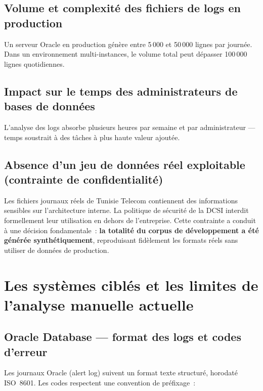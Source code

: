 \documentclass[12pt,a4paper]{report}
\begin{document}
\subsection{Volume et complexit\'e des fichiers de logs en production}

Un serveur Oracle en production g\'en\`ere entre 5\,000 et 50\,000 lignes par
journ\'ee. Dans un environnement multi-instances, le volume total peut d\'epasser
100\,000 lignes quotidiennes.

\subsection{Impact sur le temps des administrateurs de bases de donn\'ees}

L'analyse des logs absorbe plusieurs heures par semaine et par administrateur ---
temps soustrait \`a des t\^aches \`a plus haute valeur ajout\'ee.

\subsection{Absence d'un jeu de donn\'ees r\'eel exploitable (contrainte de confidentialit\'e)}

Les fichiers journaux r\'eels de Tunisie Telecom contiennent des informations
sensibles sur l'architecture interne. La politique de s\'ecurit\'e de la DCSI
interdit formellement leur utilisation en dehors de l'entreprise. Cette contrainte
a conduit \`a une d\'ecision fondamentale~: \textbf{la totalit\'e du corpus de
d\'eveloppement a \'et\'e g\'en\'er\'ee synth\'etiquement}, reproduisant
fid\`element les formats r\'eels sans utiliser de donn\'ees de production.

\section{Les syst\`emes cibl\'es et les limites de l'analyse manuelle actuelle}

\subsection{Oracle Database --- format des logs et codes d'erreur}

Les journaux Oracle (alert log) suivent un format texte structur\'e, horodat\'e
ISO~8601. Les codes respectent une convention de pr\'efixage~:
\end{document}
